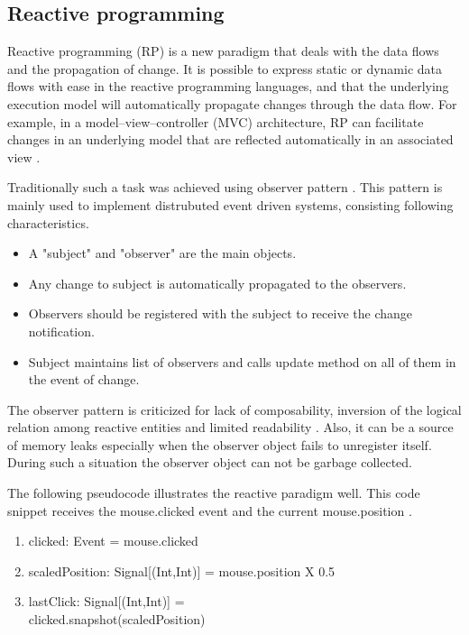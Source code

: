 \documentclass[conference]{IEEEtran}
\begin{document}
\subsection{Reactive programming}
Reactive programming (RP) is a new paradigm that deals with the data flows and the propagation of change. It is possible to express static or dynamic data flows with ease in the reactive programming languages, and that the underlying execution model will automatically propagate changes through the data flow. For example, in a model–view–controller (MVC) architecture, RP can facilitate changes in an underlying model that are reflected automatically in an associated view \cite{mvc}. \par
Traditionally such a task was achieved using observer pattern \cite{gof}. This pattern is mainly used to implement distrubuted event driven systems, consisting following characteristics.
\begin{itemize}
\item A "subject" and "observer" are the main objects.
\item Any change to subject is automatically propagated to the observers.
\item Observers should be registered with the subject to receive the change notification.
\item Subject maintains list of observers and calls update method on all of them in the event of change.
\end {itemize}
The observer pattern is criticized for lack of composability, inversion of the logical relation among reactive entities and limited readability \cite{observer}. Also, it can be a source of memory leaks especially when the observer object fails to unregister itself. During such a situation the observer object can not be garbage collected. \par

The following pseudocode \cite{reactive_walkthrough} illustrates the reactive paradigm well. This code snippet receives the mouse.clicked event and the current mouse.position .
\begin{enumerate}
\item clicked: Event = mouse.clicked
\item scaledPosition: Signal[(Int,Int)] = mouse.position X 0.5
\item lastClick: Signal[(Int,Int)] = \\
      clicked.snapshot(scaledPosition)
\end{enumerate}
\end{document}
